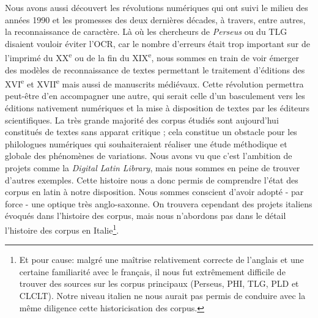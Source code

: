 Nous avons aussi découvert les révolutions numériques qui ont suivi le milieu des années 1990 et les promesses des deux dernières décades, à travers, entre autres, la reconnaissance de caractère. Là où les chercheurs de \textit{Perseus} ou du TLG disaient vouloir éviter l'OCR, car le nombre d'erreurs était trop important sur de l'imprimé du XX\textsuperscript{e} ou de la fin du XIX\textsuperscript{e}, nous sommes en train de voir émerger des modèles de reconnaissance de textes permettant le traitement d'éditions des XVI\textsuperscript{e} et XVII\textsuperscript{e} mais aussi de manuscrits médiévaux. Cette révolution permettra peut-être d'en accompagner une autre, qui serait celle d'un basculement vers les éditions nativement numériques et la mise à disposition de textes par les éditeurs scientifiques. La très grande majorité des corpus étudiés sont aujourd'hui constitués de textes sans apparat critique ; cela constitue un obstacle pour les philologues numériques qui souhaiteraient réaliser une étude méthodique et globale des phénomènes de variations. Nous avons vu que c'est l'ambition de projets comme la \textit{Digital Latin Library}, mais nous sommes en peine de trouver d'autres exemples. Cette histoire nous a donc permis de comprendre l'état des corpus en latin à notre disposition. Nous sommes conscient d'avoir adopté - par force - une optique très anglo-saxonne. On trouvera cependant des projets italiens évoqués dans l'histoire des corpus, mais nous n'abordons pas dans le détail l'histoire des corpus en Italie\footnote{Et pour cause: malgré une maîtrise relativement correcte de l'anglais et une certaine familiarité avec le français, il nous fut extrêmement difficile de trouver des sources sur les corpus principaux (Perseus, PHI, TLG, PLD et CLCLT). Notre niveau italien ne nous aurait pas permis de conduire avec la même diligence cette historicisation des corpus.}.

